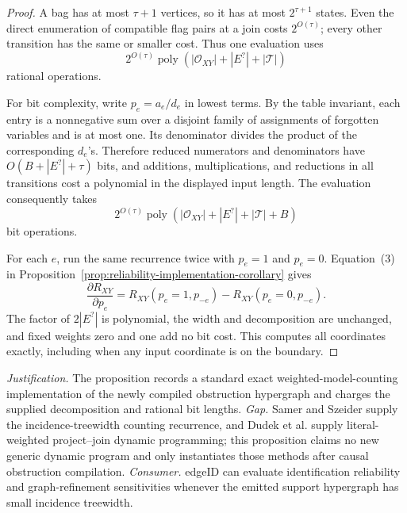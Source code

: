 \documentclass{article}
\begin{document}
\begin{proof}
A bag has at most \(\tau+1\) vertices, so it has at most \(2^{\tau+1}\) states.  Even the direct enumeration of compatible flag pairs at a join costs \(2^{O(\tau)}\); every other transition has the same or smaller cost.  Thus one evaluation uses
\[
 2^{O(\tau)}\operatorname{poly}(|\mathcal O_{XY}|+|E^{?}|+|\mathcal T|)
\]
rational operations.

For bit complexity, write \(p_e=a_e/d_e\) in lowest terms.  By the table invariant, each entry is a nonnegative sum over a disjoint family of assignments of forgotten variables and is at most one.  Its denominator divides the product of the corresponding \(d_e\)'s.  Therefore reduced numerators and denominators have \(O(B+|E^{?}|+\tau)\) bits, and additions, multiplications, and reductions in all transitions cost a polynomial in the displayed input length.  The evaluation consequently takes
\[
 2^{O(\tau)}\operatorname{poly}(|\mathcal O_{XY}|+|E^{?}|+|\mathcal T|+B)
\]
bit operations.

For each \(e\), run the same recurrence twice with \(p_e=1\) and \(p_e=0\).  Equation~(3) in Proposition~\ref{prop:reliability-implementation-corollary} gives
\[
 \frac{\partial R_{XY}}{\partial p_e}
 =R_{XY}(p_e=1,p_{-e})-R_{XY}(p_e=0,p_{-e}).
\]
The factor of \(2|E^{?}|\) is polynomial, the width and decomposition are unchanged, and fixed weights zero and one add no bit cost.  This computes all coordinates exactly, including when any input coordinate is on the boundary.
\end{proof}
\par\smallskip\noindent \textit{Justification.} The proposition records a standard exact weighted-model-counting implementation of the newly compiled obstruction hypergraph and charges the supplied decomposition and rational bit lengths. \textit{Gap.} Samer and Szeider supply the incidence-treewidth counting recurrence, and Dudek et al. supply literal-weighted project--join dynamic programming; this proposition claims no new generic dynamic program and only instantiates those methods after causal obstruction compilation. \textit{Consumer.} edgeID can evaluate identification reliability and graph-refinement sensitivities whenever the emitted support hypergraph has small incidence treewidth.
\end{document}

